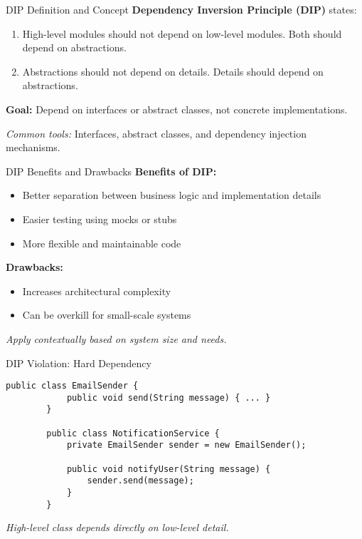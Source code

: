 \documentclass[aspectratio=169, table]{beamer}
\begin{document}
\begin{frame}[fragile]{DIP Definition and Concept}
	\vspace{20pt}
	\textbf{Dependency Inversion Principle (DIP)} states:
	\begin{enumerate}
		\item High-level modules should not depend on low-level modules. Both should depend on abstractions.
		\item Abstractions should not depend on details. Details should depend on abstractions.
	\end{enumerate}
	
	\textbf{Goal:} Depend on interfaces or abstract classes, not concrete implementations.
	
	\textit{Common tools:} Interfaces, abstract classes, and dependency injection mechanisms.
\end{frame}

\begin{frame}[fragile]{DIP Benefits and Drawbacks}
	\vspace{20pt}
	\textbf{Benefits of DIP:}
	\begin{itemize}
		\item Better separation between business logic and implementation details
		\item Easier testing using mocks or stubs
		\item More flexible and maintainable code
	\end{itemize}
	
	\textbf{Drawbacks:}
	\begin{itemize}
		\item Increases architectural complexity
		\item Can be overkill for small-scale systems
	\end{itemize}
	
	\textit{Apply contextually based on system size and needs.}
\end{frame}

\begin{frame}[fragile]{DIP Violation: Hard Dependency}
	\vspace{20pt}
	\begin{lstlisting}[style=JavaStyle]
		public class EmailSender {
			public void send(String message) { ... }
		}
		
		public class NotificationService {
			private EmailSender sender = new EmailSender();
			
			public void notifyUser(String message) {
				sender.send(message);
			}
		}
	\end{lstlisting}
	
	\textit{High-level class depends directly on low-level detail.}
\end{frame}
\end{document}

